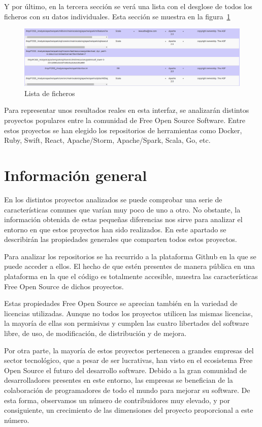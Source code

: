 \documentclass[a4paper, spanish, 12pt]{book}
\begin{document}
Y por \'ultimo, en la tercera secci\'on se ver\'a una lista con el desglose de todos
los ficheros con su datos individuales. Esta secci\'on se muestra en la figura~\ref{fig:third_row}

\begin{figure}
  \centering
  \includegraphics[width=14cm, keepaspectratio]{img/row_third}
  \caption{Lista de ficheros}
  \label{fig:third_row}
\end{figure}

Para representar unos resultados reales en esta interfaz, se analizar\'an distintos proyectos populares entre
la comunidad de Free Open Source Software. Entre estos proyectos se han elegido los
repositorios de herramientas como Docker, Ruby, Swift, React, Apache/Storm, Apache/Spark,
Scala, Go, etc.

\section{Informaci\'on general}
\label{sec:general_info}

En los distintos proyectos analizados se puede comprobar una serie de caracter\'isticas
comunes que var\'ian muy poco de uno a otro. No obstante, la informaci\'on obtenida de
estas peque\~nas diferencias nos sirve para analizar el entorno en que estos proyectos
han sido realizados. En este apartado se describir\'an las propiedades generales que
comparten todos estos proyectos.

Para analizar los repositorios se ha recurrido a la plataforma Github en la que se puede
acceder a ellos. El hecho de que est\'en presentes de manera p\'ublica
en una plataforma en la que el c\'odigo es totalmente accesible, muestra las caracter\'isticas
Free Open Source de dichos proyectos.

Estas propiedades Free Open Source se aprecian tambi\'en en la variedad de licencias utilizadas.
Aunque no todos los proyectos utilicen las mismas licencias, la mayor\'ia de ellas son permisivas
y cumplen las cuatro libertades del software libre, de uso, de modificaci\'on, de distribuci\'on
y de mejora.

Por otra parte, la mayor\'ia de estos proyectos pertenecen a grandes empresas del sector tecnol\'ogico, que
a pesar de ser lucrativas, han visto en el ecosistema Free Open Source el futuro del desarrollo software.
Debido a la gran comunidad de desarrolladores presentes en este entorno, las empresas se benefician
de la colaboraci\'on de programadores de todo el mundo para mejorar su software. De esta forma,
observamos un n\'umero de contribuidores muy elevado, y por consiguiente, un crecimiento de
las dimensiones del proyecto proporcional a este n\'umero.
\end{document}
